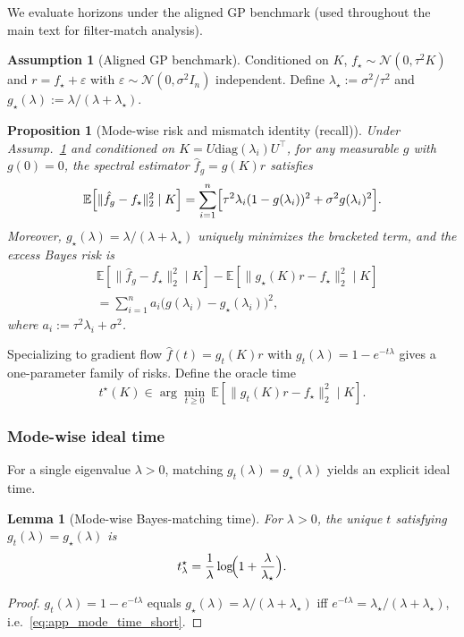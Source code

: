 \documentclass{article}
\theoremstyle{plain}
\newtheorem{proposition}[theorem]{Proposition}
\newtheorem{lemma}[theorem]{Lemma}
\theoremstyle{definition}
\newtheorem{assumption}[theorem]{Assumption}
\theoremstyle{remark}
\begin{document}
We evaluate horizons under the aligned GP benchmark (used throughout the main text for filter-match analysis).

\begin{assumption}[Aligned GP benchmark]\label{assump:app_gp_short}
Conditioned on $K$, $f_\star\sim\mathcal{N}(0,\tau^2K)$ and $r=f_\star+\varepsilon$ with $\varepsilon\sim\mathcal{N}(0,\sigma^2 I_n)$ independent.
Define $\lambda_\star:=\sigma^2/\tau^2$ and $g_\star(\lambda):=\lambda/(\lambda+\lambda_\star)$.
\end{assumption}

\begin{proposition}[Mode-wise risk and mismatch identity (recall)]\label{prop:app_risk_mismatch_short}
Under Assump.~\ref{assump:app_gp_short} and conditioned on $K=U\mathrm{diag}(\lambda_i)U^\top$, for any measurable $g$ with $g(0)=0$,
the spectral estimator $\hat f_g=g(K)r$ satisfies
\begin{equation}
\mathbb{E}\!\left[\|\hat f_g-f_\star\|_2^2\mid K\right]
=
\sum_{i=1}^n\Bigl[\tau^2\lambda_i(1-g(\lambda_i))^2+\sigma^2 g(\lambda_i)^2\Bigr].
\label{eq:app_mse_mode_short}
\end{equation}
Moreover, $g_\star(\lambda)=\lambda/(\lambda+\lambda_\star)$ uniquely minimizes the bracketed term, and the excess Bayes risk is
\begin{align}
    &\mathbb{E}\!\left[\|\hat f_g-f_\star\|_2^2\mid K\right]-\mathbb{E}\!\left[\|g_\star(K)r-f_\star\|_2^2\mid K\right] \\
    &= \sum_{i=1}^n a_i\bigl(g(\lambda_i)-g_\star(\lambda_i)\bigr)^2,
\end{align}
where $a_i:=\tau^2\lambda_i+\sigma^2$.
\end{proposition}

Specializing to gradient flow $\hat f(t)=g_t(K)r$ with $g_t(\lambda)=1-e^{-t\lambda}$ gives a one-parameter family of risks. Define the oracle time
\begin{equation}
t^\star(K)\in\arg\min_{t\ge 0}\ \mathbb{E}\!\left[\|g_t(K)r-f_\star\|_2^2\mid K\right].
\label{eq:app_oracle_time_def_short}
\end{equation}

\subsubsection{Mode-wise ideal time}
For a single eigenvalue $\lambda>0$, matching $g_t(\lambda)=g_\star(\lambda)$ yields an explicit ideal time.

\begin{lemma}[Mode-wise Bayes-matching time]\label{lem:app_mode_time_short}
For $\lambda>0$, the unique $t$ satisfying $g_t(\lambda)=g_\star(\lambda)$ is
\begin{equation}
t_\lambda^\star=\frac{1}{\lambda}\log\!\Bigl(1+\frac{\lambda}{\lambda_\star}\Bigr).
\label{eq:app_mode_time_short}
\end{equation}
\end{lemma}
\begin{proof}
$g_t(\lambda)=1-e^{-t\lambda}$ equals $g_\star(\lambda)=\lambda/(\lambda+\lambda_\star)$ iff
$e^{-t\lambda}=\lambda_\star/(\lambda+\lambda_\star)$, i.e.\ \eqref{eq:app_mode_time_short}.
\end{proof}
\end{document}
